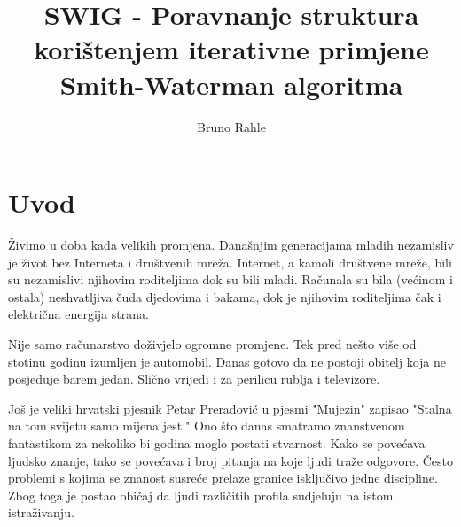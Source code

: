 \documentclass[times, utf8, zavrsni]{fer}
\begin{document}
%


\title{SWIG - Poravnanje struktura korištenjem iterativne primjene Smith-Waterman algoritma}

\author{Bruno Rahle}

\maketitle

\izvornik



\tableofcontents

\listoffigures

\listoftables

\chapter{Uvod}

Živimo u doba kada velikih promjena. Današnjim generacijama mladih nezamisliv
je život bez Interneta i društvenih mreža. Internet, a kamoli društvene mreže,
bili su nezamislivi njihovim roditeljima dok su bili mladi. Računala
su bila (većinom i ostala) neshvatljiva čuda djedovima i bakama, dok
je njihovim roditeljima čak i električna energija strana. 

Nije samo računarstvo doživjelo ogromne promjene. Tek pred nešto više od 
stotinu godinu izumljen je automobil. Danas gotovo da ne postoji obitelj
koja ne posjeduje barem jedan. Slično vrijedi i za perilicu rublja i 
televizore.

Još je veliki hrvatski pjesnik Petar Preradović u pjesmi "Mujezin" 
zapisao "Stalna na tom svijetu samo mijena jest." Ono što danas smatramo
znanstvenom fantastikom za nekoliko bi godina moglo postati stvarnost. 
Kako se povećava ljudsko znanje, tako se povećava i broj pitanja na 
koje ljudi traže odgovore. Često problemi s kojima se znanost 
susreće prelaze granice isključivo jedne discipline. Zbog toga je postao
običaj da ljudi različitih profila sudjeluju na istom
istraživanju. 
\end{document}
